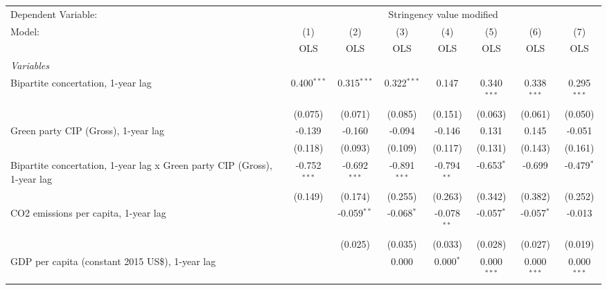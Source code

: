 
\begingroup
\centering
\begin{tabular}{lccccccc}
   \toprule
   Dependent Variable: & \multicolumn{7}{c}{Stringency value modified}\\
   Model:                                                                   & (1)            & (2)            & (3)            & (4)           & (5)           & (6)           & (7)\\  
                                                                            &  OLS           & OLS            & OLS            & OLS           & OLS           & OLS           & OLS\\  
   \midrule
   \emph{Variables}\\
   Bipartite concertation, 1-year lag                                       & 0.400$^{***}$  & 0.315$^{***}$  & 0.322$^{***}$  & 0.147         & 0.340$^{***}$ & 0.338$^{***}$ & 0.295$^{***}$\\   
                                                                            & (0.075)        & (0.071)        & (0.085)        & (0.151)       & (0.063)       & (0.061)       & (0.050)\\   
   Green party CIP (Gross), 1-year lag                                      & -0.139         & -0.160         & -0.094         & -0.146        & 0.131         & 0.145         & -0.051\\   
                                                                            & (0.118)        & (0.093)        & (0.109)        & (0.117)       & (0.131)       & (0.143)       & (0.161)\\   
   Bipartite concertation, 1-year lag x Green party CIP (Gross), 1-year lag & -0.752$^{***}$ & -0.692$^{***}$ & -0.891$^{***}$ & -0.794$^{**}$ & -0.653$^{*}$  & -0.699        & -0.479$^{*}$\\   
                                                                            & (0.149)        & (0.174)        & (0.255)        & (0.263)       & (0.342)       & (0.382)       & (0.252)\\   
   CO2 emissions per capita, 1-year lag                                     &                & -0.059$^{**}$  & -0.068$^{*}$   & -0.078$^{**}$ & -0.057$^{*}$  & -0.057$^{*}$  & -0.013\\   
                                                                            &                & (0.025)        & (0.035)        & (0.033)       & (0.028)       & (0.027)       & (0.019)\\   
   GDP per capita (constant 2015 US\$), 1-year lag                          &                &                & 0.000          & 0.000$^{*}$   & 0.000$^{***}$ & 0.000$^{***}$ & 0.000$^{***}$\\   

\end{tabular}
